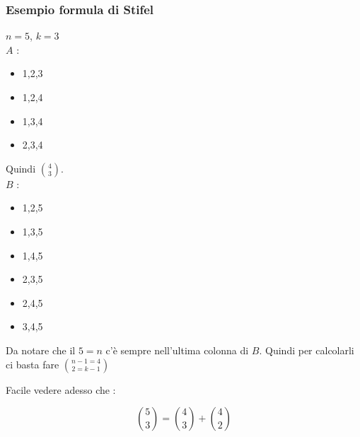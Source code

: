 \documentclass[11pt]{article}
\begin{document}
			\subsubsection{Esempio formula di Stifel}

			$n=5$, $k=3$\\

			$A$ : \begin{itemize}
				\item 1,2,3
				\item 1,2,4
				\item 1,3,4
				\item 2,3,4
			\end{itemize}

			Quindi $\binom{4}{3}$.\\

			$B$ : \begin{itemize}
				\item 1,2,5
				\item 1,3,5
				\item 1,4,5
				\item 2,3,5
				\item 2,4,5
				\item 3,4,5
			\end{itemize}

			Da notare che il $5 = n$ c'\`e sempre nell'ultima colonna di $B$.
			Quindi per calcolarli ci basta fare $\binom{n-1=4}{2=k-1}$

			Facile vedere adesso che :

			\[
				\binom{5}{3} = \binom{4}{3} + \binom{4}{2}
			\]
\end{document}
